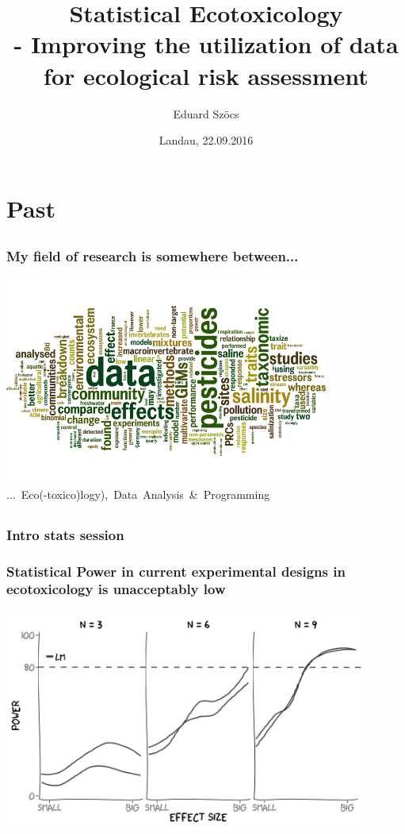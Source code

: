 \documentclass[12pt, t]{beamer}
\title{Statistical Ecotoxicology \\ - Improving the utilization of data for ecological risk assessment}
\author{Eduard Szöcs}
\institute{Institute for Environmental Sciences, University of Koblenz-Landau}
\date{Landau, 22.09.2016}
\begin{document}
\begin{frame}
\titlepage
\end{frame}


\section{Past} 

\subsection{}
\begin{frame}
\frametitle{My field of research is somewhere between...}
\center
\includegraphics[width = 0.8\textwidth]{fig/wc_all.png} \\
\mbox{... Eco(-toxico)logy), Data Analysis \& Programming}
\end{frame}


\subsection{}
\begin{frame}
\frametitle{Intro stats session}
\end{frame}


\begin{frame}
\frametitle{Statistical Power in current experimental designs in ecotoxicology is unacceptably low}
\center
\includegraphics[width = 0.9\textwidth]{fig/glm2.png} \\
\end{frame}
\end{document}
